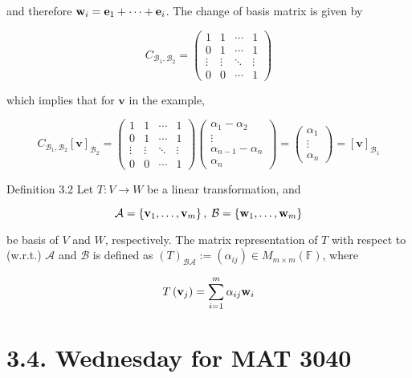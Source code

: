 \documentclass[11pt]{article}
\begin{document}
and therefore \({\bf w}_{i} = {\mathbf{e}}_1 + \cdots  + {\mathbf{e}}_{i}\). The change of basis matrix is given by

\[
{C}_{{\mathcal{B}}_1,{\mathcal{B}}_2} = \left( \begin{matrix} 1 & 1 & \cdots & 1 \\  0 & 1 & \cdots & 1 \\  \vdots & \vdots &  \ddots  & \vdots \\  0 & 0 & \cdots & 1 \end{matrix}\right)
\]

which implies that for \(\mathbf{v}\) in the example,

\[
{C}_{{\mathcal{B}}_1,{\mathcal{B}}_2}{\left\lbrack  \mathbf{v}\right\rbrack  }_{{\mathcal{B}}_2} = \left( \begin{matrix} 1 & 1 & \cdots & 1 \\  0 & 1 & \cdots & 1 \\  \vdots & \vdots &  \ddots  & \vdots \\  0 & 0 & \cdots & 1 \end{matrix}\right) \left( \begin{matrix} \alpha_1 - \alpha_2 \\  \vdots \\  \alpha_{n - 1} - \alpha_n \\  \alpha_n \end{matrix}\right)  = \left( \begin{matrix} \alpha_1 \\  \vdots \\  \alpha_n \end{matrix}\right)  = {\left\lbrack  \mathbf{v}\right\rbrack  }_{{\mathcal{B}}_1}
\]

Definition 3.2 Let \(T : V \rightarrow  W\) be a linear transformation, and

\[
\mathcal{A} = \left\{  {{\bf v}_1,\ldots ,{\bf v}_{m}}\right\}  ,\;\mathcal{B} = \left\{  {{\bf w}_1,\ldots ,{\bf w}_{m}}\right\}
\]

be basis of \(V\) and \(W\), respectively. The matrix representation of \(T\) with respect to (w.r.t.) \(\mathcal{A}\) and \(\mathcal{B}\) is defined as \({\left( T\right) }_{\mathcal{B}\mathcal{A}} \mathrel{\text{ := }} \left( \alpha_{ij}\right)  \in  {M}_{m \times  m}\left( \mathbb{F}\right)\), where

\[
T\left( {\bf v}_{j}\right)  = \mathop{\sum }\limits_{{i = 1}}^{m}\alpha_{ij}{\bf w}_{i}
\]

\section*{3.4. Wednesday for MAT 3040}
\end{document}
